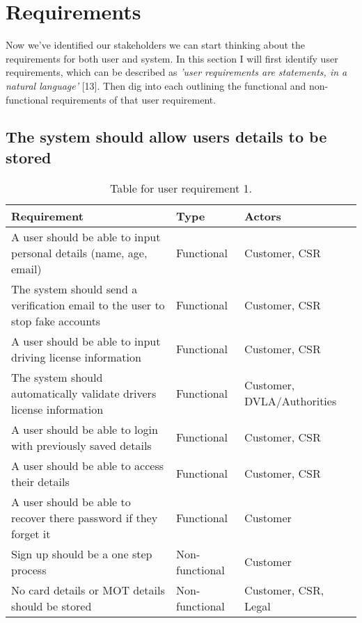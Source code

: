 \section{Requirements}
  Now we've identified our stakeholders we can start thinking about the requirements for both user and system. In this section I will first identify user
  requirements, which can be described as \textit{'user requirements are statements, in a natural language'} [13].
  Then dig into each outlining the functional and non-functional requirements of that user requirement.

  \subsection{The system should allow users details to be stored}
    \begin{table}[H]
      \centering
      \begin{tabular}{|p{}|p{}|p{}|}
        \hline
        Requirement & Type & Actors \\ \hline
        A user should be able to input personal details (name, age, email) & Functional & Customer, CSR \\ \hline
        The system should send a verification email to the user to stop fake accounts & Functional & Customer, CSR \\ \hline
        A user should be able to input driving license information & Functional & Customer, CSR \\ \hline
        The system should automatically validate drivers license information & Functional & Customer, DVLA/Authorities \\ \hline
        A user should be able to login with previously saved details & Functional & Customer, CSR \\ \hline
        A user should be able to access their details & Functional & Customer, CSR \\ \hline
        A user should be able to recover there password if they forget it & Functional  & Customer \\ \hline
        Sign up should be a one step process & Non-functional & Customer \\ \hline
        No card details or MOT details should be stored & Non-functional & Customer, CSR, Legal \\ \hline
      \end{tabular}
      \caption{Table for user requirement 1.}
    \end{table}

